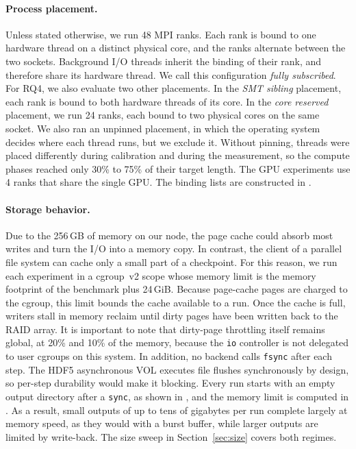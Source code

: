 \paragraph{Process placement.} Unless stated otherwise, we run 48 MPI ranks.
Each rank is bound to one hardware thread on a distinct physical core, and
the ranks alternate between the two sockets. Background I/O threads inherit
the binding of their rank, and therefore share its hardware thread. We call
this configuration \emph{fully subscribed}. For RQ4, we also evaluate two
other placements. In the \emph{SMT sibling} placement, each rank is bound to
both hardware threads of its core. In the \emph{core reserved} placement,
we run 24 ranks, each bound to two physical cores on the same socket. We
also ran an unpinned placement, in which the operating system decides where
each thread runs, but we exclude it. Without pinning, threads were placed
differently during calibration and during the measurement, so the compute
phases reached only 30\% to 75\% of their target length. The GPU experiments use 4 ranks that share the single GPU. The binding
lists are constructed in \srcBinding.

\paragraph{Storage behavior.} Due to the 256\,GB of memory on our node, the
page cache could absorb most writes and turn the I/O into a memory copy. In
contrast, the client of a parallel file system can cache only a small part
of a checkpoint. For this reason, we run each experiment in a cgroup~v2
scope whose memory limit is the memory footprint of the benchmark plus
24\,GiB. Because page-cache pages are charged to the cgroup, this limit
bounds the cache available to a run. Once the cache is full, writers stall
in memory reclaim until dirty pages have been written back to the RAID
array. It is important to note that dirty-page throttling itself remains
global, at 20\% and 10\% of the memory, because the \texttt{io} controller is
not delegated to user cgroups on this system. In addition, no backend calls
\texttt{fsync} after each step. The HDF5 asynchronous VOL executes file
flushes synchronously by design, so per-step durability would make it
blocking. Every run starts with an empty output directory after a
\texttt{sync}, as shown in \srcCgroup, and the memory limit is computed in
\srcMemMax. As a result, small outputs of up to tens of gigabytes per run
complete largely at memory speed, as they would with a burst buffer, while
larger outputs are limited by write-back. The size sweep in
Section~\ref{sec:size} covers both regimes.

